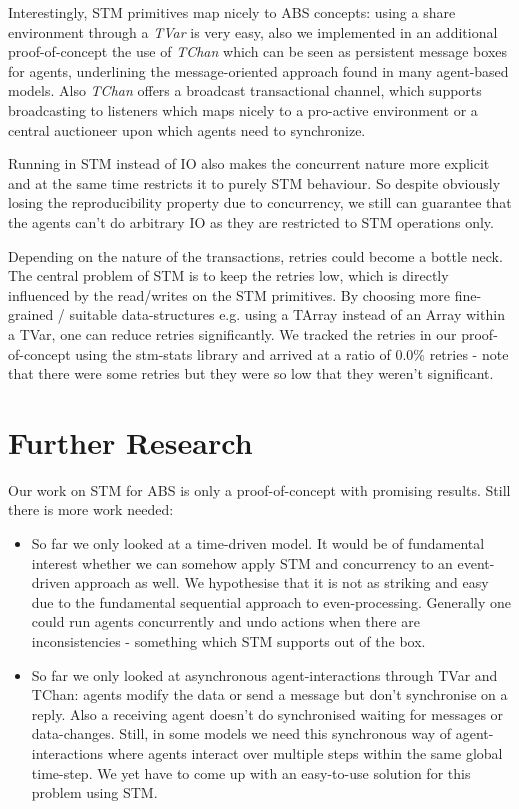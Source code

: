 Interestingly, STM primitives map nicely to ABS concepts: using a share environment through a \textit{TVar} is very easy, also we implemented in an additional proof-of-concept the use of \textit{TChan} which can be seen as persistent message boxes for agents, underlining the message-oriented approach found in many agent-based models. Also \textit{TChan} offers a broadcast transactional channel, which supports broadcasting to listeners which maps nicely to a pro-active environment or a central auctioneer upon which agents need to synchronize.

Running in STM instead of IO also makes the concurrent nature more explicit and at the same time restricts it to purely STM behaviour. So despite obviously losing the reproducibility property due to concurrency, we still can guarantee that the agents can't do arbitrary IO as they are restricted to STM operations only.

Depending on the nature of the transactions, retries could become a bottle neck. The central problem of STM is to keep the retries low, which is directly influenced by the read/writes on the STM primitives. By choosing more fine-grained / suitable data-structures e.g. using a TArray instead of an Array within a TVar, one can reduce retries significantly. We tracked the retries in our proof-of-concept using the stm-stats library and arrived at a ratio of 0.0\% retries - note that there were some retries but they were so low that they weren't significant.

\section{Further Research}
\label{sect:stm_further}
Our work on STM for ABS is only a proof-of-concept with promising results. Still there is more work needed:

\begin{itemize}
	\item So far we only looked at a time-driven model. It would be of fundamental interest whether we can somehow apply STM and concurrency to an event-driven approach as well. We hypothesise that it is not as striking and easy due to the fundamental sequential approach to even-processing. Generally one could run agents concurrently and undo actions when there are inconsistencies - something which STM supports out of the box.
	\item So far we only looked at asynchronous agent-interactions through TVar and TChan: agents modify the data or send a message but don't synchronise on a reply. Also a receiving agent doesn't do synchronised waiting for messages or data-changes. Still, in some models we need this synchronous way of agent-interactions where agents interact over multiple steps within the same global time-step. We yet have to come up with an easy-to-use solution for this problem using STM.
\end{itemize}